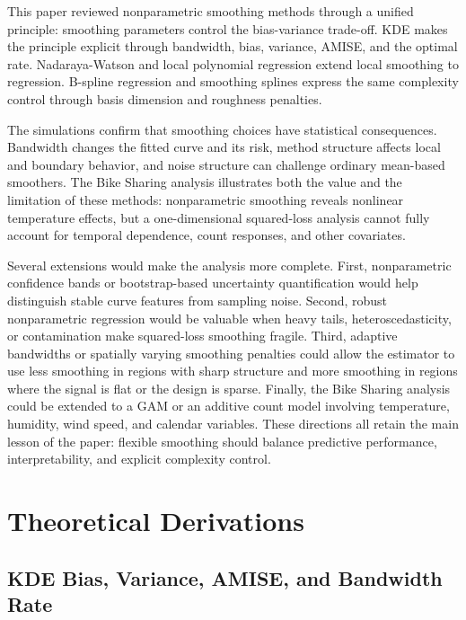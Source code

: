 \documentclass[12pt,a4paper]{article}
\begin{document}
This paper reviewed nonparametric smoothing methods through a unified principle: smoothing parameters control the bias-variance trade-off. KDE makes the principle explicit through bandwidth, bias, variance, AMISE, and the optimal rate. Nadaraya-Watson and local polynomial regression extend local smoothing to regression. B-spline regression and smoothing splines express the same complexity control through basis dimension and roughness penalties.

The simulations confirm that smoothing choices have statistical consequences. Bandwidth changes the fitted curve and its risk, method structure affects local and boundary behavior, and noise structure can challenge ordinary mean-based smoothers. The Bike Sharing analysis illustrates both the value and the limitation of these methods: nonparametric smoothing reveals nonlinear temperature effects, but a one-dimensional squared-loss analysis cannot fully account for temporal dependence, count responses, and other covariates.

Several extensions would make the analysis more complete. First, nonparametric confidence bands or bootstrap-based uncertainty quantification would help distinguish stable curve features from sampling noise. Second, robust nonparametric regression would be valuable when heavy tails, heteroscedasticity, or contamination make squared-loss smoothing fragile. Third, adaptive bandwidths or spatially varying smoothing penalties could allow the estimator to use less smoothing in regions with sharp structure and more smoothing in regions where the signal is flat or the design is sparse. Finally, the Bike Sharing analysis could be extended to a GAM or an additive count model involving temperature, humidity, wind speed, and calendar variables. These directions all retain the main lesson of the paper: flexible smoothing should balance predictive performance, interpretability, and explicit complexity control.

\newpage



\appendix
\section{Theoretical Derivations}

\subsection{KDE Bias, Variance, AMISE, and Bandwidth Rate}
\label{app:kde}
\end{document}

